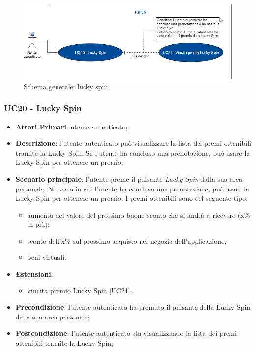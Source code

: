 \begin{figure}[h]
	\includegraphics[width=13cm]{res/images/UC20Luckyspin.png}
	\centering
	\caption{Schema generale: lucky spin}
\end{figure}
\subsubsection{UC20 - Lucky Spin}
\begin{itemize}
	\item \textbf{Attori Primari}: utente autenticato;
	\item \textbf{Descrizione}:	l'utente autenticato può visualizzare la lista dei premi ottenibili tramite la Lucky Spin\glo. Se l'utente ha concluso una prenotazione, può usare la Lucky Spin per ottenere un premio;
	\item \textbf{Scenario principale}: l'utente preme il pulsante \textit{Lucky Spin} dalla sua area personale. Nel caso in cui l'utente ha concluso una prenotazione, può usare la Lucky Spin per ottenere un premio. I premi ottenibili sono del seguente tipo:
	\begin{itemize}
		\item aumento del valore del prossimo buono sconto che si andrà a ricevere (x\% in più);
		\item sconto dell'x\% sul prossimo acquisto nel negozio dell'applicazione;
		\item beni virtuali.
	\end{itemize}
	\item \textbf{Estensioni}: 
	\begin{itemize}
		\item vincita premio Lucky Spin [UC21].
	\end{itemize}
	\item \textbf{Precondizione}: l'utente autenticato ha premuto il pulsante della Lucky Spin dalla sua area personale;
	\item \textbf{Postcondizione}: l'utente autenticato sta visualizzando la lista dei premi ottenibili tramite la Lucky Spin;
\end{itemize}

